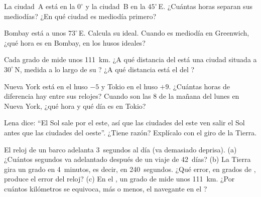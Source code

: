 \begin{exercise}[$\star\star$]\label{exo:g6:latitude-longitude:6}
La ciudad~A está en la  $0^\circ$ y la ciudad~B en la 
$45^\circ$\,E. ¿Cuántas horas separan sus mediodías? ¿En qué ciudad es
mediodía primero?
\end{exercise}

\begin{exercise}[$\star\star$]\label{exo:g6:latitude-longitude:7}
Bombay está a unos $73^\circ$\,E. Calcula su  ideal. Cuando es
mediodía en Greenwich, ¿qué hora es en Bombay, en los husos ideales?
\end{exercise}

\begin{exercise}[$\star\star$]\label{exo:g6:latitude-longitude:8}
Cada grado de  mide unos \qty{111}{km}. ¿A qué distancia del 
está una ciudad situada a $30^\circ$\,N, medida a lo largo de su ?
¿A qué distancia está el  del ?
\end{exercise}

\begin{exercise}[$\star\star$]\label{exo:g6:latitude-longitude:9}
Nueva York está en el huso $-5$ y Tokio en el huso $+9$. ¿Cuántas horas de
diferencia hay entre sus relojes? Cuando son las 8 de la mañana del lunes
en Nueva York, ¿qué hora y qué día es en Tokio?
\end{exercise}

\begin{exercise}[$\star\star$]\label{exo:g6:latitude-longitude:10}
Lena dice: ``El Sol sale por el este, así que las ciudades del este ven
salir el Sol antes que las ciudades del oeste''. ¿Tiene razón? Explícalo
con el giro de la Tierra.
\end{exercise}

\begin{exercise}[$\star\star\star$]\label{exo:g6:latitude-longitude:11}
El reloj de un barco adelanta 3~segundos al día (va demasiado deprisa).
(a) ¿Cuántos segundos va adelantado después de un viaje de 42~días? (b) La
Tierra gira un grado en 4~minutos, es decir, en 240~segundos. ¿Qué error,
en grados de , produce el error del reloj? (c) En el , un
grado de  mide unos \qty{111}{km}. ¿Por cuántos kilómetros se
equivoca, más o menos, el navegante en el ?
\end{exercise}

